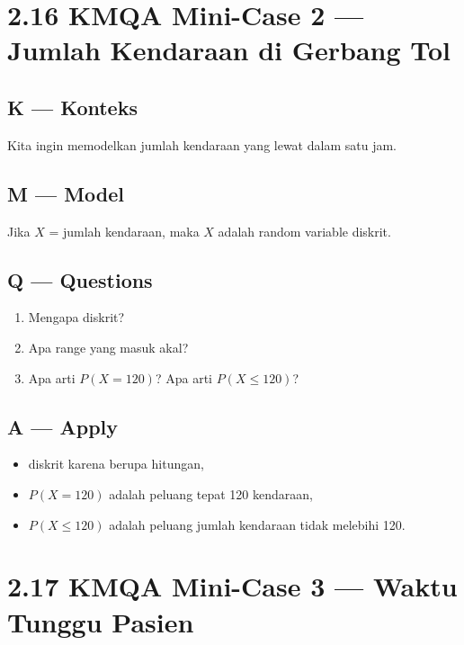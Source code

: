 \documentclass[
  letterpaper,
  DIV=11,
  numbers=noendperiod]{scrreprt}
\providecommand{\tightlist}{%
  \setlength{\itemsep}{0pt}\setlength{\parskip}{0pt}}
\begin{document}
\section{2.16 KMQA Mini-Case 2 --- Jumlah Kendaraan di Gerbang
Tol}\label{kmqa-mini-case-2-jumlah-kendaraan-di-gerbang-tol}

\subsection{K --- Konteks}\label{k-konteks-8}

Kita ingin memodelkan jumlah kendaraan yang lewat dalam satu jam.

\subsection{M --- Model}\label{m-model-8}

Jika \(X\) = jumlah kendaraan, maka \(X\) adalah random variable
diskrit.

\subsection{Q --- Questions}\label{q-questions-8}

\begin{enumerate}
\def\labelenumi{\arabic{enumi}.}
\tightlist
\item
  Mengapa diskrit?
\item
  Apa range yang masuk akal?
\item
  Apa arti \(P(X=120)\)? Apa arti \(P(X\le 120)\)?
\end{enumerate}

\subsection{A --- Apply}\label{a-apply-8}

\begin{itemize}
\tightlist
\item
  diskrit karena berupa hitungan,
\item
  \(P(X=120)\) adalah peluang tepat 120 kendaraan,
\item
  \(P(X\le 120)\) adalah peluang jumlah kendaraan tidak melebihi 120.
\end{itemize}

\section{2.17 KMQA Mini-Case 3 --- Waktu Tunggu
Pasien}\label{kmqa-mini-case-3-waktu-tunggu-pasien}
\end{document}
